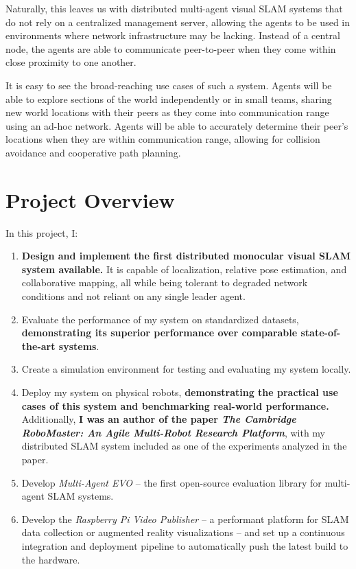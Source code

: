 Naturally, this leaves us with distributed multi-agent visual SLAM systems that do not rely on a centralized management server, allowing the agents to be used in environments where network infrastructure may be lacking. Instead of a central node, the agents are able to communicate peer-to-peer when they come within close proximity to one another.

It is easy to see the broad-reaching use cases of such a system. Agents will be able to explore sections of the world independently or in small teams, sharing new world locations with their peers as they come into communication range using an ad-hoc network. Agents will be able to accurately determine their peer's locations when they are within communication range, allowing for collision avoidance and cooperative path planning.

\section{Project Overview}
\label{sec:project-overview}
In this project, I: \noparskip
{
    \begin{enumerate}
        \item \textbf{Design and implement the first distributed monocular visual SLAM system available.}  It is capable of localization, relative pose estimation, and collaborative mapping, all while being tolerant to degraded network conditions and not reliant on any single leader agent. %
        \item Evaluate the performance of my system on standardized datasets, \textbf{demonstrating its superior performance over comparable state-of-the-art systems}.
        \item Create a simulation environment for testing and evaluating my system locally.
        \item Deploy my system on physical robots, \textbf{demonstrating the practical use cases of this system and benchmarking real-world performance.} Additionally, \textbf{I was an author of the paper \textit{The Cambridge RoboMaster: An Agile Multi-Robot Research Platform}}, with my distributed SLAM system included as one of the experiments analyzed in the paper.
        \item Develop \textit{Multi-Agent EVO} – the first open-source evaluation library for multi-agent SLAM systems.
        \item Develop the \textit{Raspberry Pi Video Publisher} – a performant platform for SLAM data collection or augmented reality visualizations – and set up a continuous integration and deployment pipeline to automatically push the latest build to the hardware.
    \end{enumerate}
}


